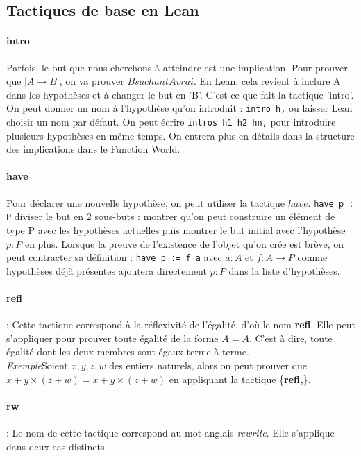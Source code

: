 \subsection{Tactiques de base en Lean}


\paragraph{intro}

Parfois, le but que nous cherchons à atteindre est une implication. Pour prouver que |$A \to B$|, on va prouver $B sachant A vrai$. En Lean, cela revient à inclure A dans les hypothèses et à changer le but en 'B'. C'est ce que fait la tactique 'intro'. On peut donner un nom à l'hypothèse qu'on introduit : \texttt{intro h,} ou laisser Lean choisir un nom par défaut.
On peut écrire \texttt{intros h1 h2 \Idots hn,} pour introduire plusieurs hypothèses en même temps.
On entrera plus en détails dans la structure des implications dans le Function World.

\paragraph{have}

Pour déclarer une nouvelle hypothèse, on peut utiliser la tactique $have$.
\texttt{have p : P} diviser le but en 2 sous-buts : montrer qu'on peut construire un élément de type P avec les hypothèses actuelles puis montrer le but initial avec l'hypothèse $p : P$ en plus.
Lorsque la preuve de l'existence de l'objet qu'on crée est brève, on peut contracter sa définition :
\texttt{have p := f a} avec $a : A$ et $f : A \to P$ comme hypothèses déjà présentes ajoutera directement $p : P$ dans la liste d'hypothèses.  


\paragraph {refl}: Cette tactique correspond à la réflexivité de l'égalité, d'où le nom \textbf{refl}. Elle peut s'appliquer pour prouver toute égalité de la forme $A=A$. C'est à dire, toute égalité dont les deux membres sont égaux terme à terme. \\
\textit{Exemple}Soient $x,y,z,w$ des entiers naturels, alors on peut prouver que $x+y \times (z+w)=x+y \times (z+w)$ en appliquant la tactique \big\{\textbf{refl,}\big\}.
\paragraph {\large\textbf{rw}}: Le nom de cette tactique correspond au mot anglais \textit{rewrite}. Elle s'applique dans deux cas distincts.

